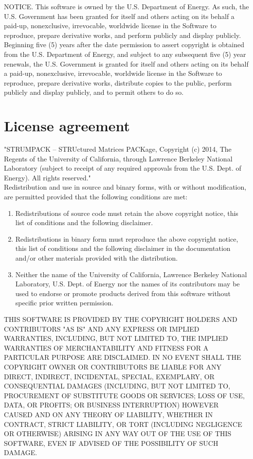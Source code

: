 \documentclass{article}
\begin{document}
NOTICE. This software is owned by the U.S. Department of Energy. As
such, the U.S. Government has been granted for itself and others
acting on its behalf a paid-up, nonexclusive, irrevocable, worldwide
license in the Software to reproduce, prepare derivative works, and
perform publicly and display publicly. Beginning five (5) years after
the date permission to assert copyright is obtained from the
U.S. Department of Energy, and subject to any subsequent five (5) year
renewals, the U.S. Government is granted for itself and others acting
on its behalf a paid-up, nonexclusive, irrevocable, worldwide license
in the Software to reproduce, prepare derivative works, distribute
copies to the public, perform publicly and display publicly, and to
permit others to do so.

\section{License agreement}
"STRUMPACK -- STRUctured Matrices PACKage, Copyright (c) 2014, The
Regents of the University of California, through Lawrence Berkeley
National Laboratory (subject to receipt of any required approvals
from the U.S. Dept. of Energy).  All rights reserved."\\

Redistribution and use in source and binary forms, with or without
modification, are permitted provided that the following conditions
are met:

\begin{enumerate}
\item Redistributions of source code must retain the above copyright
  notice, this list of conditions and the following disclaimer.

\item Redistributions in binary form must reproduce the above
  copyright notice, this list of conditions and the following
  disclaimer in the documentation and/or other materials provided with
  the distribution.

\item Neither the name of the University of California, Lawrence
  Berkeley National Laboratory, U.S. Dept. of Energy nor the names of
  its contributors may be used to endorse or promote products derived
  from this software without specific prior written permission.
\end{enumerate}

THIS SOFTWARE IS PROVIDED BY THE COPYRIGHT HOLDERS AND CONTRIBUTORS
"AS IS" AND ANY EXPRESS OR IMPLIED WARRANTIES, INCLUDING, BUT NOT
LIMITED TO, THE IMPLIED WARRANTIES OF MERCHANTABILITY AND FITNESS
FOR A PARTICULAR PURPOSE ARE DISCLAIMED. IN NO EVENT SHALL THE
COPYRIGHT OWNER OR CONTRIBUTORS BE LIABLE FOR ANY DIRECT, INDIRECT,
INCIDENTAL, SPECIAL, EXEMPLARY, OR CONSEQUENTIAL DAMAGES (INCLUDING,
BUT NOT LIMITED TO, PROCUREMENT OF SUBSTITUTE GOODS OR SERVICES;
LOSS OF USE, DATA, OR PROFITS; OR BUSINESS INTERRUPTION) HOWEVER
CAUSED AND ON ANY THEORY OF LIABILITY, WHETHER IN CONTRACT, STRICT
LIABILITY, OR TORT (INCLUDING NEGLIGENCE OR OTHERWISE) ARISING IN
ANY WAY OUT OF THE USE OF THIS SOFTWARE, EVEN IF ADVISED OF THE
POSSIBILITY OF SUCH DAMAGE.\\
\end{document}
